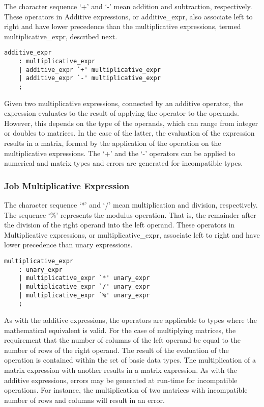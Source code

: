 \documentclass[prodmode,acmtecs]{acmsmall}
\begin{document}
The character sequence `+' and `-' mean addition and subtraction, 
respectively. These operators in Additive expressions, or additive\_expr, 
also associate left to right and have lower precedence than the 
multiplicative expressions, termed multiplicative\_expr, described next.

\begin{lstlisting}
additive_expr
	: multiplicative_expr
	| additive_expr `+' multiplicative_expr
	| additive_expr `-' multiplicative_expr
	;
\end{lstlisting}

Given two multiplicative expressions, connected by an additive operator, 
the expression evaluates to the result of applying the operator to the
operands. However, this depends on the type of the operands, which can
range from integer or doubles to matrices. In the case of the latter,
the evaluation of the expression results in a matrix, formed by the 
application of the operation on the multiplicative expressions.
The `+' and the `-' operators can be applied to numerical and matrix types 
and errors are generated for incompatible types.
\medskip

\subsubsection{Job Multiplicative Expression}

The character sequence `*' and `/' mean multiplication and division, 
respectively. The sequence `\%' represents the modulus operation. That
is, the remainder after the division of the right operand into the left
operand. These operators in Multiplicative expressions, or 
multiplicative\_expr, associate left to right and have lower precedence 
than unary expressions.

\begin{lstlisting}
multiplicative_expr
	: unary_expr
	| multiplicative_expr `*' unary_expr
	| multiplicative_expr `/' unary_expr
	| multiplicative_expr `%' unary_expr
	;
\end{lstlisting}

As with the additive expressions, the operators are applicable to types
where the mathematical equivalent is valid. For the case of multiplying
matrices, the requirement that the number of columns of the left operand 
be equal to the number of rows of the right operand. The result of the
evaluation of the operation is contained within the set of basic data 
types. The multiplication of a matrix expression with another results in 
a matrix expression. As with the additive expressions, errors may be 
generated at run-time for incompatible operations. For instance, the
multiplication of two matrices with incompatible number of rows and
columns will result in an error.
\medskip
\end{document}

